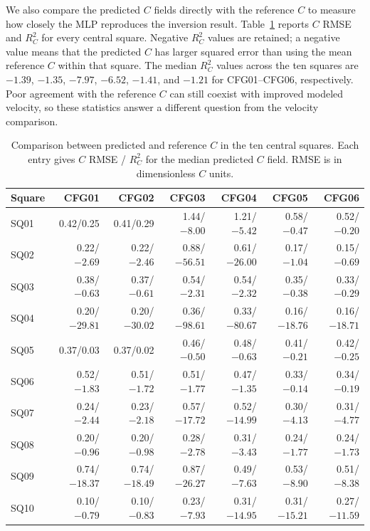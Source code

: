 \documentclass[review,jog]{igs}
\providecommand{\toprule}{\hline}
\providecommand{\midrule}{\hline}
\providecommand{\bottomrule}{\hline}
\begin{document}
We also compare the predicted $C$ fields directly with the reference $C$ to
measure how closely the MLP reproduces the inversion result.
Table~\ref{tab:c_diagnostics} reports $C$ RMSE and $R_C^2$ for every central
square. Negative $R_C^2$ values are retained; a negative value means that the
predicted $C$ has larger squared error than using the mean reference $C$ within
that square. The median $R_C^2$ values across the ten squares are $-1.39$,
$-1.35$, $-7.97$, $-6.52$, $-1.41$, and $-1.21$ for CFG01--CFG06,
respectively. Poor agreement with the reference $C$ can still coexist with improved modeled velocity, so these statistics answer a different question from the velocity comparison.

\begin{table}
\caption{Comparison between predicted and reference $C$ in the ten central
squares. Each entry gives $C$ RMSE / $R_C^2$ for the median predicted $C$
field. RMSE is in dimensionless $C$ units.}
\label{tab:c_diagnostics}
\centering\scriptsize
\setlength{\tabcolsep}{4pt}
\begin{tabular}{lrrrrrr}
\toprule
Square & CFG01 & CFG02 & CFG03 & CFG04 & CFG05 & CFG06\\
\midrule
SQ01 & 0.42/0.25 & 0.41/0.29 & 1.44/$-8.00$ & 1.21/$-5.42$ & 0.58/$-0.47$ & 0.52/$-0.20$ \\
SQ02 & 0.22/$-2.69$ & 0.22/$-2.46$ & 0.88/$-56.51$ & 0.61/$-26.00$ & 0.17/$-1.04$ & 0.15/$-0.69$ \\
SQ03 & 0.38/$-0.63$ & 0.37/$-0.61$ & 0.54/$-2.31$ & 0.54/$-2.32$ & 0.35/$-0.38$ & 0.33/$-0.29$ \\
SQ04 & 0.20/$-29.81$ & 0.20/$-30.02$ & 0.36/$-98.61$ & 0.33/$-80.67$ & 0.16/$-18.76$ & 0.16/$-18.71$ \\
SQ05 & 0.37/0.03 & 0.37/0.02 & 0.46/$-0.50$ & 0.48/$-0.63$ & 0.41/$-0.21$ & 0.42/$-0.25$ \\
SQ06 & 0.52/$-1.83$ & 0.51/$-1.72$ & 0.51/$-1.77$ & 0.47/$-1.35$ & 0.33/$-0.14$ & 0.34/$-0.19$ \\
SQ07 & 0.24/$-2.44$ & 0.23/$-2.18$ & 0.57/$-17.72$ & 0.52/$-14.99$ & 0.30/$-4.13$ & 0.31/$-4.77$ \\
SQ08 & 0.20/$-0.96$ & 0.20/$-0.98$ & 0.28/$-2.78$ & 0.31/$-3.43$ & 0.24/$-1.77$ & 0.24/$-1.73$ \\
SQ09 & 0.74/$-18.37$ & 0.74/$-18.49$ & 0.87/$-26.27$ & 0.49/$-7.63$ & 0.53/$-8.90$ & 0.51/$-8.38$ \\
SQ10 & 0.10/$-0.79$ & 0.10/$-0.83$ & 0.23/$-7.93$ & 0.31/$-14.95$ & 0.31/$-15.21$ & 0.27/$-11.59$ \\
\bottomrule
\end{tabular}
\end{table}
\end{document}
